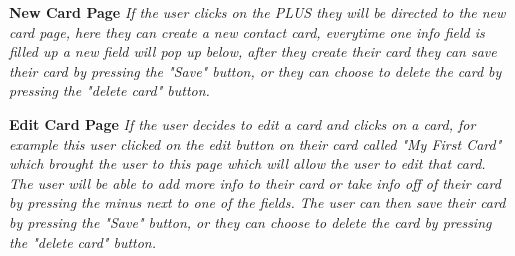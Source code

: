 \documentclass[12pt]{article}%
\begin{document}
\begin{center}
		\clearpage
	{\bf \Large New Card Page}
	{\it If the user clicks on the PLUS they will be directed to the new card page, here they can create a new contact card, everytime one info field is 
	filled up a new field will pop up below, after they create their card they can save their card by pressing the "Save" button, or they can choose to 
	delete the card by pressing the "delete card" button.}
	
		\clearpage
	{\bf \Large Edit Card Page}
	{\it If the user decides to edit a card and clicks on a card, for example this user clicked on the edit button on their card called "My First Card" 
	which brought the user
	to this page which will allow the user to edit that card. The user will be able to add more info to their card or take info off of their card by pressing the 
	minus next to one of the fields. The user can then save their card by pressing the "Save" button, or they can choose to 
	delete the card by pressing the "delete card" button.}
	

\end{center}
\end{document}
